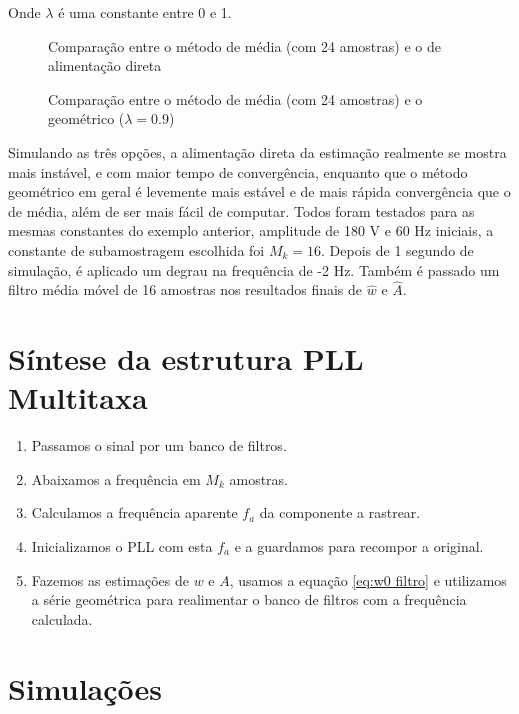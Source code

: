 Onde $\lambda$ é uma constante entre 0 e 1. \\

\begin{figure}[h]
	\centering    
	\def\svgscale{1}
	
	\caption{Comparação entre o método de média (com 24 amostras) e o de alimentação direta}
	\label{fig:esquema_pll}
\end{figure}

\begin{figure}[h]
	\centering    
	\def\svgscale{1}
	
	\caption{Comparação entre o método de média (com 24 amostras) e o geométrico ($\lambda=0.9$)}
	\label{fig:esquema_pll}
\end{figure}

\indent Simulando as três opções, a alimentação direta da estimação realmente se mostra mais instável, e com maior tempo de convergência, enquanto que o método geométrico em geral é levemente mais estável e de mais rápida convergência que o de média, além de ser mais fácil de computar. Todos foram testados para as mesmas constantes do exemplo anterior, amplitude de 180 V e 60 Hz iniciais, a constante de subamostragem escolhida foi $M_k=16$. Depois de 1 segundo de simulação, é aplicado um degrau na frequência de -2 Hz. Também é passado um filtro média móvel de 16 amostras nos resultados finais de $\hat{w}$ e $\hat{A}$.

\section{Síntese da estrutura PLL Multitaxa}

\begin{enumerate}
	\item Passamos o sinal por um banco de filtros.
	\item Abaixamos a frequência em $M_k$ amostras.
	\item Calculamos a frequência aparente $f_a$ da componente a rastrear.
	\item Inicializamos o PLL com esta $f_a$ e a guardamos para recompor a original.
	\item Fazemos as estimações de $w$ e $A$, usamos a equação \ref{eq:w0 filtro} e utilizamos a série geométrica para realimentar o banco de filtros com a frequência calculada.
\end{enumerate}

\section{Simulações}

